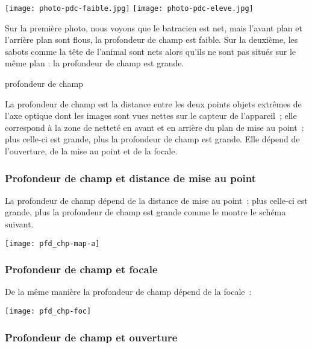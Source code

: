 \documentclass[../main/main.tex]{subfiles}
\begin{document}
\begin{center}
    \texttt{[image: photo-pdc-faible.jpg]} \qquad
    \texttt{[image: photo-pdc-eleve.jpg]}
\end{center}

Sur la première photo, nous voyons que le batracien est net, mais l'avant plan
et l'arrière plan sont flous, la profondeur de champ est faible. Sur la
deuxième, les sabots comme la tête de l'animal sont nets alors qu'ils ne sont
pas situés sur le même plan : la profondeur de champ est grande.

\begin{defi}[label=def:pdc]{profondeur de champ}
    
    La profondeur de champ est la distance entre les deux points objets extrêmes
    de l'axe optique dont les images sont vues nettes sur le capteur de
    l'appareil~; elle correspond à la zone de netteté en avant et en
    arrière du plan de mise au point~: plus celle-ci est grande, plus la
    profondeur de champ est grande. Elle dépend de l'ouverture, de la mise au
    point et de la focale.
\end{defi}

\subsubsection{Profondeur de champ et distance de mise au point} %
 
La profondeur de champ dépend de la distance de mise au point~: plus celle-ci est
grande, plus la profondeur de champ est grande comme le montre le schéma
suivant.

\begin{center}
	\texttt{[image: pfd\_chp-map-a]}
\end{center}

\subsubsection{Profondeur de champ et focale} %

De la même manière la profondeur de champ dépend de la focale~:

\begin{center}
	\texttt{[image: pfd\_chp-foc]}
\end{center}

\subsubsection{Profondeur de champ et ouverture} %
\end{document}
